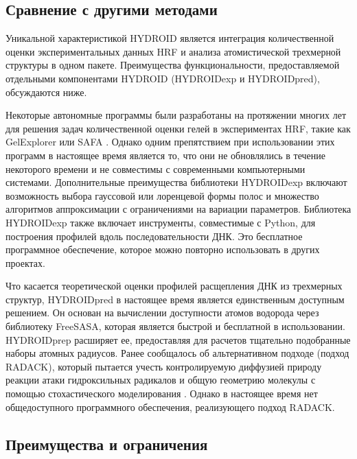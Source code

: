 \subsection{Сравнение с другими методами}

    Уникальной характеристикой HYDROID является интеграция количественной оценки экспериментальных данных HRF и анализа атомистической трехмерной структуры в одном пакете. Преимущества функциональности, предоставляемой отдельными компонентами HYDROID (HYDROIDexp и HYDROIDpred), обсуждаются ниже.
    
    Некоторые автономные программы были разработаны на протяжении многих лет для решения задач количественной оценки гелей в экспериментах HRF, такие как GelExplorer \cite{shadle_quantitative_1997} или SAFA \cite{das_safa_2005}. Однако одним препятствием при использовании этих программ в настоящее время является то, что они не обновлялись в течение некоторого времени и не совместимы с современными компьютерными системами. Дополнительные преимущества библиотеки HYDROIDexp включают возможность выбора гауссовой или лоренцевой формы полос и множество алгоритмов аппроксимации с ограничениями на вариации параметров. Библиотека HYDROIDexp также включает инструменты, совместимые с Python, для построения профилей вдоль последовательности ДНК. Это бесплатное программное обеспечение, которое можно повторно использовать в других проектах.

    Что касается теоретической оценки профилей расщепления ДНК из трехмерных структур, HYDROIDpred в настоящее время является единственным доступным решением. Он основан на вычислении доступности атомов водорода через библиотеку FreeSASA, которая является быстрой и бесплатной в использовании. HYDROIDprep расширяет ее, предоставляя для расчетов тщательно подобранные наборы атомных радиусов. Ранее сообщалось об альтернативном подходе (подход RADACK), который пытается учесть контролируемую диффузией природу реакции атаки гидроксильных радикалов и общую геометрию молекулы с помощью стохастического моделирования \cite{begusova_radack_2001}. Однако в настоящее время нет общедоступного программного обеспечения, реализующего подход RADACK.

\subsection{Преимущества и ограничения}

